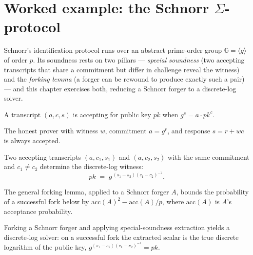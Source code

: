 \chapter{Worked example: the Schnorr $\Sigma$-protocol}

Schnorr's identification protocol runs over an abstract
prime-order group $\mathbb{G} = \langle g \rangle$ of order $p$. Its soundness
rests on two pillars --- \emph{special soundness} (two accepting transcripts that
share a commitment but differ in challenge reveal the witness) and the
\emph{forking lemma} (a forger can be rewound to produce exactly such a pair) ---
and this chapter exercises both, reducing a Schnorr forger to a discrete-log
solver.

\begin{definition}[Acceptance]
  \label{def:schnorr-accepts}
  A transcript $(a, c, s)$ is accepting for public key $\mathit{pk}$ when
  $g^{s} = a \cdot \mathit{pk}^{c}$.
  \leanok
\end{definition}

\begin{theorem}[Completeness]
  \label{thm:schnorr-complete}
  \leanok
  The honest prover with witness $w$, commitment $a = g^{r}$, and response
  $s = r + w c$ is always accepted.
\end{theorem}

\begin{theorem}
  \label{thm:schnorr-soundness}
  \leanok
  Two accepting transcripts $(a, c_1, s_1)$ and $(a, c_2, s_2)$ with the same
  commitment and $c_1 \neq c_2$ determine the discrete-log witness:
  \[
    \mathit{pk} \;=\; g^{\,(s_1 - s_2)(c_1 - c_2)^{-1}}.
  \]
\end{theorem}

\begin{theorem}
  \label{thm:schnorr-forking}
  \leanok
  The general forking lemma, applied to a Schnorr forger $A$, bounds the
  probability of a successful fork below by
  $\mathrm{acc}(A)^2 - \mathrm{acc}(A)/p$, where $\mathrm{acc}(A)$ is $A$'s
  acceptance probability.
\end{theorem}

\begin{theorem}
  \label{thm:schnorr-dl}
  \leanok
  Forking a Schnorr forger and applying special-soundness extraction yields a
  discrete-log solver: on a successful fork the extracted scalar is the true
  discrete logarithm of the public key, $g^{(s_1 - s_2)(c_1 - c_2)^{-1}} =
  \mathit{pk}$.
\end{theorem}
